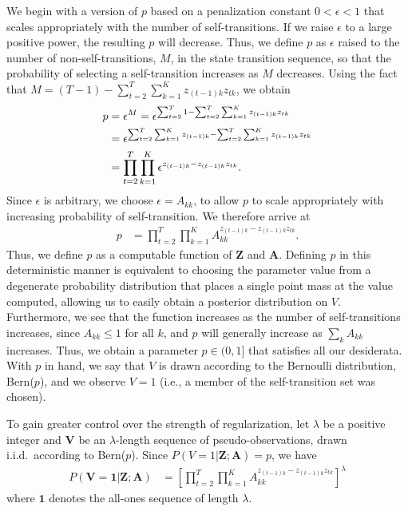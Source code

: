 \documentclass[letterpaper]{article}
\begin{document}
We begin with a version of $p$ based on a penalization constant $0 < \epsilon <
1$ that scales appropriately with the number of self-transitions. If we raise
$\epsilon$ to a large positive power, the resulting $p$ will decrease. Thus, we
define $p$ as $\epsilon$ raised to the number of non-self-transitions, $M$, in
the state transition sequence, so that the probability of selecting a
self-transition increases as $M$ decreases. Using
the fact that $M=(T-1) - \sum^{T}_{t=2}\sum^{K}_{k=1}z_{(t-1)k}z_{tk}$, we obtain
\begin{align}
    p &= \epsilon^M = \epsilon^{\sum^{T}_{t=2}1 -
    \sum^{T}_{t=2}\sum^{K}_{k=1}z_{(t-1)k}z_{tk}} \notag\\
      &= \epsilon^{\sum^{T}_{t=2}\sum^{K}_{k=1}z_{(t-1)k} - \sum^{T}_{t=2}\sum^{K}_{k=1}z_{(t-1)k}z_{tk}} \notag\\
      &= \prod^{T}_{t=2}\prod_{k=1}^{K}\epsilon^{z_{(t-1)k} - z_{(t-1)k}z_{tk}}. \label{eq:eps-0}
\end{align}
Since $\epsilon$ is arbitrary, we choose $\epsilon = A_{kk}$, to allow $p$ to scale appropriately with increasing probability of self-transition. We therefore arrive at
\begin{align*}
    p &= \prod^{T}_{t=2}\prod^{K}_{k=1}A_{kk}^{z_{(t-1)k} - z_{(t-1)k}z_{tk}}.
\end{align*}
Thus, we define $p$ as a computable function of $\mathbf{Z}$ and $\mathbf{A}$.
Defining $p$ in this deterministic manner is equivalent to choosing the
parameter value from a degenerate probability distribution that places a single
point mass at the value computed, allowing us to easily obtain a posterior
distribution on $V$. Furthermore, we see that the function increases as the
number of self-transitions increases, since $A_{kk} \leq 1$ for all $k$, and $p$
will generally increase as $\sum_k A_{kk}$ increases. Thus, we obtain a
parameter $p \in (0,1]$ that satisfies all our desiderata.
With $p$ in hand, we say that $V$ is drawn according to the Bernoulli
distribution, Bern($p$), and we observe $V = 1$ (i.e., a member of the
self-transition set was chosen). 

To gain greater control over the strength of regularization, let $\lambda$ be a
positive integer and $\mathbf{V}$ be an $\lambda$-length sequence of
pseudo-observations, drawn i.i.d.\ according to Bern($p$). Since $P(V =
1|\mathbf{Z};\mathbf{A}) = p$, we have
\begin{align*}
    P(\mathbf{V} = \mathbf{1}|\mathbf{Z}; \mathbf{A}) &= \left[\prod^{T}_{t=2}\prod^{K}_{k=1}A_{kk}^{z_{(t-1)k} - z_{(t-1)k}z_{tk}}\right]^\lambda
\end{align*}
where $\mathbf{1}$ denotes the all-ones sequence of length $\lambda$.
\end{document}
